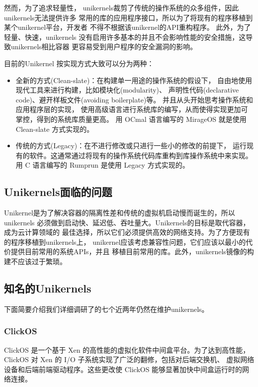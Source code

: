 \documentclass{../runikraft-report}
\begin{document}
然而，为了追求轻量性，
unikernels裁剪了传统的操作系统的众多组件，因此unikernels无法提供许多
常用的库的应用程序接口，所以为了将现有的程序移植到某个unikernel平台，开发者
不得不根据该unikernel的API重构程序。\cite{bib:unikraft}
此外，为了轻量、快速，unikernels
没有启用许多基本的并且不会影响性能的安全措施，这导致unikernels相比容器
更容易受到用户程序的安全漏洞的影响。\cite{bib:unikernel-secuirty}

目前的Unikernel 按实现方式大致可以分为两种：
\begin{itemize}
\item 全新的方式(Clean-slate)：在构建单一用途的操作系统的假设下，
自由地使用现代工具来进行构建，比如模块化(modularity)、
声明性代码(declarative code)、避开样板文件(avoiding boilerplate)等。
并且从头开始思考操作系统和应用程序层的实现，
使用高级语言进行系统库的编写，从而使得实现更加可掌控，得到的系统库质量更高。
用 OCmal 语言编写的 MirageOS 就是使用 Clean-slate 方式实现的。
\item 传统的方式(Legacy)：在不进行修改或只进行一些小的修改的前提下，
运行现有的软件。这通常通过将现有的操作系统代码库重构到库操作系统中来实现。
用 C 语言编写的 Rumprun 是使用 Legacy 方式实现的。
\end{itemize}

\subsection{Unikernels面临的问题}
Unikernel是为了解决容器的隔离性差和传统的虚拟机启动慢而诞生的，所以unikernels
必须做到启动快、延迟低、吞吐量大。Unikernels的目标是取代容器，成为云计算领域的
最佳选择，所以它们必须提供高效的网络支持。为了方便现有的程序移植到unikernels上，
unikernel应该考虑兼容性问题，它们应该以最小的代价提供目前常用的系统APIs，并且
移植目前常用的库。此外，unikernels镜像的构建不应该过于繁琐。

\subsection{知名的Unikernels}\label{subsec:famous-unikernel-projects}
下面简要介绍我们详细调研了的七个近两年仍然在维护unikernels。

\subsubsection{ClickOS}

ClickOS 是一个基于 Xen 的高性能的虚拟化软件中间盒平台。为了达到高性能，
ClickOS 对 Xen 的 I/O 子系统实现了广泛的翻修，包括对后端交换机、
虚拟网络设备和后端前端驱动程序。这些更改使 ClickOS 能够显著加快中间盒运行时的网络连接。\cite{bib:12-clickos}
\end{document}
